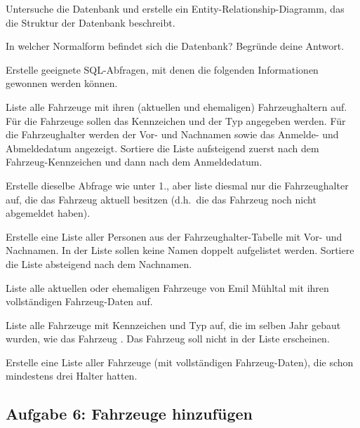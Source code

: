 \begin{compactenum}[a)]
\item Untersuche die Datenbank und erstelle ein Entity-Relationship-Diagramm,
das die Struktur der Datenbank beschreibt.

\item In welcher Normalform befindet sich die Datenbank? Begründe deine Antwort.

\item Erstelle geeignete SQL-Abfragen, mit denen die folgenden Informationen
gewonnen werden können.
\begin{compactenum}[1.]
\item Liste alle Fahrzeuge mit ihren (aktuellen und ehemaligen) Fahrzeughaltern
auf. Für die Fahrzeuge sollen das Kennzeichen und der Typ angegeben werden. Für
die Fahrzeughalter werden der Vor- und Nachnamen sowie das Anmelde- und
Abmeldedatum angezeigt. Sortiere die Liste aufsteigend zuerst nach dem
Fahrzeug-Kennzeichen und dann nach dem Anmeldedatum.

\item Erstelle dieselbe Abfrage wie unter 1., aber liste diesmal nur die
Fahrzeughalter auf, die das Fahrzeug aktuell besitzen (d.h.\ die das Fahrzeug
noch nicht abgemeldet haben).

\item Erstelle eine Liste aller Personen aus der Fahrzeughalter-Tabelle mit Vor-
und Nachnamen. In der Liste sollen keine Namen doppelt aufgelistet werden.
Sortiere die Liste absteigend nach dem Nachnamen.

\item Liste alle aktuellen oder ehemaligen Fahrzeuge von Emil Mühltal mit ihren
 vollständigen Fahrzeug-Daten auf.

\item Liste alle Fahrzeuge mit Kennzeichen und Typ auf, die im selben Jahr
gebaut wurden, wie das Fahrzeug . Das Fahrzeug
 soll nicht in der Liste erscheinen.

\item Erstelle eine Liste aller Fahrzeuge (mit vollständigen Fahrzeug-Daten),
die schon mindestens drei Halter hatten.
\end{compactenum}
\end{compactenum}


\subsection{Aufgabe 6: Fahrzeuge hinzufügen}

